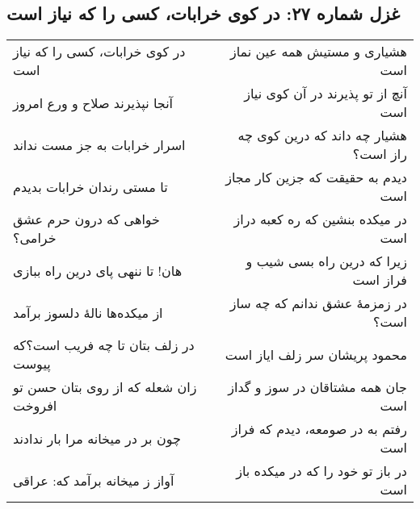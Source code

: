 \begin{center}
\section*{غزل شماره ۲۷: در کوی خرابات، کسی را که نیاز است}
\label{sec:027}
\begin{longtable}{l p{0.5cm} r}
در کوی خرابات، کسی را که نیاز است
&&
هشیاری و مستیش همه عین نماز است
\\
آنجا نپذیرند صلاح و ورع امروز
&&
آنچ از تو پذیرند در آن کوی نیاز است
\\
اسرار خرابات به جز مست نداند
&&
هشیار چه داند که درین کوی چه راز است؟
\\
تا مستی رندان خرابات بدیدم
&&
دیدم به حقیقت که جزین کار مجاز است
\\
خواهی که درون حرم عشق خرامی؟
&&
در میکده بنشین که ره کعبه دراز است
\\
هان! تا ننهی پای درین راه ببازی
&&
زیرا که درین راه بسی شیب و فراز است
\\
از میکده‌ها نالهٔ دلسوز برآمد
&&
در زمزمهٔ عشق ندانم که چه ساز است؟
\\
در زلف بتان تا چه فریب است؟که پیوست
&&
محمود پریشان سر زلف ایاز است
\\
زان شعله که از روی بتان حسن تو افروخت
&&
جان همه مشتاقان در سوز و گداز است
\\
چون بر در میخانه مرا بار ندادند
&&
رفتم به در صومعه، دیدم که فراز است
\\
آواز ز میخانه برآمد که: عراقی
&&
در باز تو خود را که در میکده باز است
\\
\end{longtable}
\end{center}
